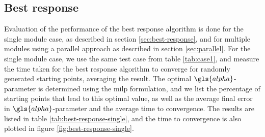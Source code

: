 \documentclass[main.tex]{subfiles}
\begin{document}
\subsection{Best response}

Evaluation of the performance of the best response algorithm is done for the single module case, as described in section \ref{sec:best-response}, and for multiple modules using a parallel approach as described in section \ref{sec:parallel}.
For the single module case, we use the same test case from table \ref{tab:case1}, and measure the time taken for the best response algorithm to converge for randomly generated starting points, averaging the result.
The optimal $\gls{alpha}$-parameter is determined using the \gls{milp} formulation, and we list the percentage of starting points that lead to this optimal value, as well as the average final error in $\gls{alpha}$-parameter and the average time to convergence. 
The results are listed in table \ref{tab:best-response-single}, and the time to convergence is also plotted in figure \ref{fig:best-response-single}.
\end{document}
